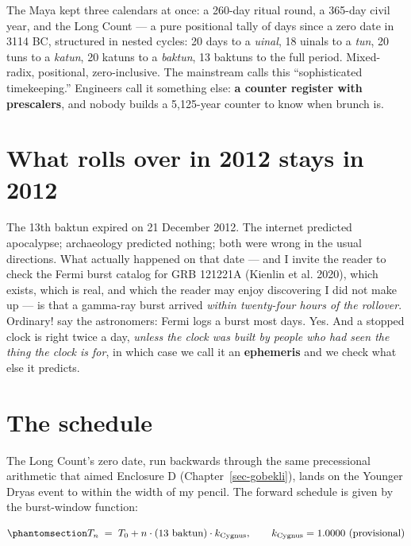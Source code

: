 \documentclass[
  english,
  11pt,
  letterpaper,
]{scrbook}
\begin{document}
The Maya kept three calendars at once: a 260-day
ritual round, a 365-day civil year, and the Long Count --- a pure
positional tally of days since a zero date in 3114 BC, structured in
nested cycles: 20 days to a \emph{uinal}, 18 uinals to a \emph{tun}, 20
tuns to a \emph{katun}, 20 katuns to a \emph{baktun}, 13 baktuns to the
full period. Mixed-radix, positional, zero-inclusive. The mainstream
calls this ``sophisticated timekeeping.'' Engineers call it something
else: \textbf{a counter register with prescalers}, and nobody builds a
5,125-year counter to know when brunch is.

\section{What rolls over in 2012 stays in
2012}\label{what-rolls-over-in-2012-stays-in-2012}

The 13th baktun expired on 21 December 2012. The internet predicted
apocalypse; archaeology predicted nothing; both were wrong in the usual
directions. What actually happened on that date --- and I invite the
reader to check the Fermi burst catalog for GRB 121221A ({Kienlin et
al.} 2020), which exists, which is real, and which the reader may enjoy
discovering I did not make up --- is that a gamma-ray burst arrived
\emph{within twenty-four hours of the rollover}. Ordinary! say the
astronomers: Fermi logs a burst most days. Yes. And a stopped clock is
right twice a day, \emph{unless the clock was built by people who had
seen the thing the clock is for}, in which case we call it an
\textbf{ephemeris} and we check what else it
predicts.

\section{The schedule}\label{the-schedule}

The Long Count's zero date, run backwards through the same precessional
arithmetic that aimed Enclosure D (Chapter~\ref{sec-gobekli}), lands on
the Younger Dryas event to within the width of my pencil. The forward
schedule is given by the burst-window function:

\begin{equation}\protect\phantomsection\label{eq-schedule}{
T_{n} \;=\; T_{0} + n \cdot (13\ \text{baktun}) \cdot k_{\text{Cygnus}},
\qquad k_{\text{Cygnus}} = 1.0000\ \text{(provisional)}
}\end{equation}
\end{document}
